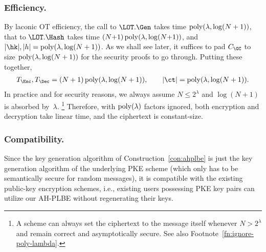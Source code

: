 \subsubsection{Efficiency.}
By laconic OT efficiency,
the call to
$\LOT.\Gen$ takes time ${\operatorname{poly}(\lambda,\log(N+1))}$,
that to
$\LOT.\Hash$ takes time ${(N{+}1)\operatorname{poly}(\lambda,\log(N{+}1))}$, and
${|\hk|,|h|=\poly(\lambda,\log(N+1))}$.
As we shall see later, it suffices to pad $C_\GC$ to size ${\operatorname{poly}(\lambda,\log(N+1))}$ for the security proofs to go through.
Putting these together,
\begin{align*}
T_\Enc,T_\Dec
=
(N+1)\poly(\lambda,\log(N+1)),
\qquad
|\ct|
=
\poly(\lambda,\log(N+1)).
\end{align*}
In practice and for security reasons,
we always assume ${N\leq 2^\lambda}$ and ${\log(N+1)}$ is absorbed by~$\lambda$.%
\footnote{%
A scheme can always set the ciphertext to the message itself
whenever ${N>2^\lambda}$ and
remain correct and asymptotically secure.
See also Footnote~\ref{fn:ignore-poly-lambda}.}
Therefore, with $\operatorname{poly}(\lambda)$ factors ignored,
both encryption and decryption take linear time,
and the ciphertext is constant-size.

\subsubsection{Compatibility.}
Since the key generation algorithm of Construction~\ref{con:ahplbe} is just the key generation algorithm of the underlying PKE scheme (which only has to be semantically secure for random messages),
it is compatible with the existing public-key encryption schemes,
i.e., existing users possessing PKE key pairs can utilize our AH-PLBE without regenerating their keys.
